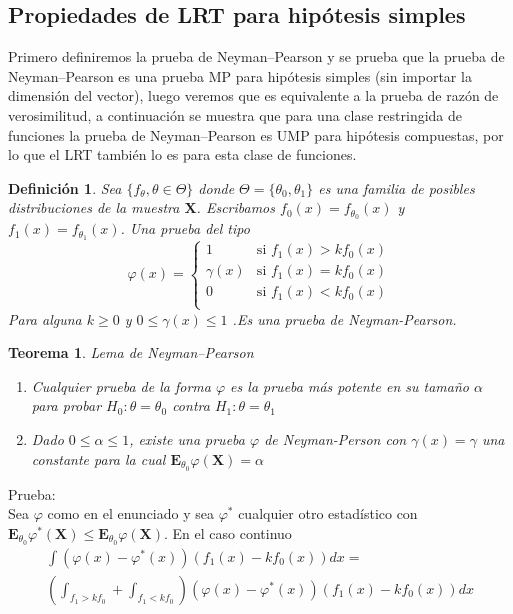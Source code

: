 \documentclass[peerreview]{IEEEtran}
\newtheorem{theorem}{Teorema}
\newtheorem{definition}{Definición}
\begin{document}
\subsection{Propiedades de LRT para hipótesis simples}
Primero definiremos la prueba de Neyman–Pearson y se prueba que la prueba de Neyman–Pearson es una prueba MP para hipótesis simples (sin importar la dimensión del vector), luego veremos que es equivalente a la prueba de razón de verosimilitud, a continuación se muestra que para una clase restringida de funciones la prueba de Neyman–Pearson es UMP para hipótesis compuestas, por lo que el LRT también lo es para esta clase de funciones.
\begin{definition}
Sea $\{f_\theta , \theta \in \Theta \}$ donde $\Theta = \{\theta_0,\theta_1\}$ es una familia de posibles distribuciones de la muestra $\mathbf{X}$. Escribamos $f_0(x)=f_{\theta_0}(x)$ y $f_1(x)=f_{\theta_1}(x)$.
Una prueba del tipo 	\[
			\varphi(x)= \left\{ \begin{array}{lr}
							1 &	\textrm{si  } f_1(x) > kf_0(x) \\
							\gamma(x)  & \textrm{si  } f_1(x) = kf_0(x) \\ 
							0 & \textrm{si  } f_1(x) < kf_0(x) \\
							\end{array}
					\right.
		\] 
Para alguna $k\geq 0$ y $0 \leq \gamma(x) \leq 1$ 
.Es una prueba de Neyman-Pearson.
\end{definition}
\begin{theorem}{ Lema de Neyman–Pearson} 
\begin{enumerate}
\item Cualquier prueba de la forma $\varphi$ es la prueba más potente en su tamaño $\alpha$ para probar $H_0: \theta = \theta_0$ contra $H_1: \theta = \theta_1$
\item Dado $0 \leq \alpha \leq 1$, existe una prueba  $\varphi$ de Neyman-Person con $\gamma(x) = \gamma$ una constante para la cual $\mathbf{E}_{\theta_0}\varphi(\mathbf{X} )= \alpha$  
\end{enumerate}
\end{theorem}
Prueba:\\
Sea $\varphi$ como en el enunciado y sea $\varphi^*$ cualquier otro estadístico con $\mathbf{E}_{\theta_0}\varphi^*(\mathbf{X} )  \leq \mathbf{E}_{\theta_0}\varphi(\mathbf{X} )$. En el caso continuo 
\begin{equation}
\begin{split}
\int ( \varphi(x) -\varphi^*(x) ) (f_1(x)-kf_0(x))dx =\\   (\int_{f_1>kf_0} + \int_{f_1 < kf_0 } ) ( \varphi(x) -\varphi^*(x) ) (f_1(x)-kf_0(x))dx \\
\end{split}
\end{equation}
\end{document}
